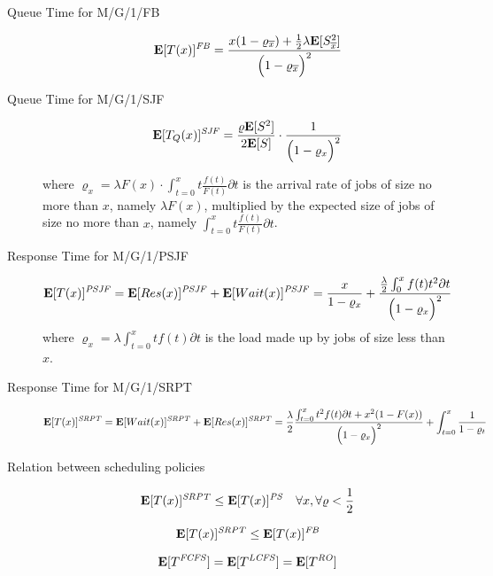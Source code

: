 \begin{description}
	\item [Queue Time for M/G/1/FB]
		\begin{equation}
		\mathbf{E}[T(x)]^{\mathit{FB}}=
		\frac{x(1-\varrho_{\overline{x}})+\frac{1}{2}\lambda\mathbf{E}[S_{\overline{x}}^{2}]}
			{\Big(1-\varrho_{\overline{x}}\Big)^{2}}
		\end{equation}
		
	\item [Queue Time for M/G/1/SJF]
		\begin{equation}
		\mathbf{E}[T_{Q}(x)]^{\mathit{SJF}}=
		\frac{\varrho\mathbf{E}[S^{2}]}{2\mathbf{E}[S]}\cdot\frac{1}{\Big(1-\varrho_{x}\Big)^{2}}
		\end{equation}
		
		where $\varrho_{x}=\lambda F(x)\cdot\int_{t=0}^{x}t\frac{f(t)}{F(t)}\partial t$ is the arrival rate of jobs of size no more than $x$, namely $\lambda F(x)$, multiplied by the expected size of jobs of size no more than $x$, namely $\int_{t=0}^{x}t\frac{f(t)}{F(t)}\partial t$.
		
	\item [Response Time for M/G/1/PSJF]
		\begin{equation}
		\mathbf{E}[T(x)]^{\mathit{PSJF}}=
		\mathbf{E}[Res(x)]^{\mathit{PSJF}}+\mathbf{E}[Wait(x)]^{\mathit{PSJF}}=
		\frac{x}{1-\varrho_{x}}+
		\frac{\frac{\lambda}{2}\int_{0}^{x}f(t)t^{2}\partial t}
		{\Big(1-\varrho_{x}\Big)^{2}}
		\end{equation}
		where $\varrho_{x}=\lambda\int_{t=0}^{x}tf(t)\partial t$ is the load made up by jobs of size less than $x$.
	
	\item [Response Time for M/G/1/SRPT]
		\begin{equation}
		\mathbf{E}[T(x)]^{\mathit{SRPT}}=
		\mathbf{E}[Wait(x)]^{\mathit{SRPT}}+\mathbf{E}[Res(x)]^{\mathit{SRPT}}=
		\frac{\lambda}{2}\frac{\int_{t=0}^{x}t^{2}f(t)\partial t + x^{2}(1-F(x))}{\Big(1-\varrho_{x}\Big)^{2}}+
		\int_{t=0}^{x}\frac{1}{1-\varrho_{t}}
		\end{equation}
		
	\item [Relation between scheduling policies]
	
	\begin{equation}
	\mathbf{E}[T(x)]^{\mathit{SRPT}}\leq\mathbf{E}[T(x)]^{\mathit{PS}}\quad \forall x,\forall\varrho<\frac{1}{2}
	\end{equation}
	
	\begin{equation}
	\mathbf{E}[T(x)]^{\mathit{SRPT}}\leq\mathbf{E}[T(x)]^{\mathit{FB}}
	\end{equation}
	
	\begin{equation}
	\mathbf{E}[T^{\mathit{FCFS}}]=\mathbf{E}[T^{\mathit{LCFS}}]=\mathbf{E}[T^{\mathit{RO}}]
	\end{equation}

\end{description}